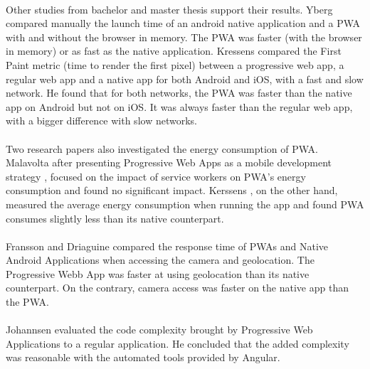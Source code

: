 \documentclass{kththesis}
\begin{document}
\paragraph{}
Other studies from bachelor and master thesis support their results. Yberg \cite{YbergViktor2018NPaU} compared manually the launch time of an android native application and a PWA with and without the browser in memory. The PWA was faster (with the browser in memory) or as fast as the native application. Kressens \cite{PWAapplicability} compared the First Paint metric (time to render the first pixel) between a progressive web app, a regular web app and a native app for both Android and iOS, with a fast and slow network. He found that for both networks, the PWA was faster than the native app on Android but not on iOS. It was always faster than the regular web app, with a bigger difference with slow networks.


\paragraph{}
Two research papers also investigated the energy consumption of PWA. Malavolta after presenting Progressive Web Apps as a mobile development strategy \cite{malavolta2016beyond}, focused on the impact of service workers on PWA's energy consumption and found no significant impact\cite{SW_and_energy}. Kerssens \cite{PWAapplicability}, on the other hand, measured the average energy consumption when running the app and found PWA consumes slightly less than its native counterpart. 

\paragraph{}
Fransson and Driaguine \cite{PWAbc_responsetime} compared the response time of PWAs and Native Android Applications when accessing the camera and geolocation. The Progressive Webb App was faster at using geolocation than its native counterpart. On the contrary, camera access was faster on the native app than the PWA.

\paragraph{}
Johannsen \cite{JohannsenFabian2018PWAa} evaluated the code complexity brought by Progressive Web Applications to a regular application. He concluded that the added complexity was reasonable with the automated tools provided by Angular. 
\end{document}
